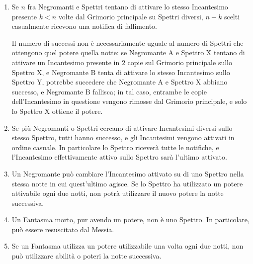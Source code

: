 \documentclass[a4paper,10pt]{article}
\begin{document}
\begin{enumerate}


	\item Se $n$ fra Negromanti e Spettri tentano di attivare lo stesso Incantesimo presente $k<n$ volte dal Grimorio principale su Spettri diversi, $n-k$ scelti casualmente ricevono una notifica di fallimento.

	      Il numero di successi non è necessariamente uguale al numero di Spettri che ottengono quel potere quella notte: se Negromante A e Spettro X tentano di attivare un Incantesimo presente in $2$ copie sul Grimorio principale sullo Spettro X, e Negromante B tenta di attivare lo stesso Incantesimo sullo Spettro Y, potrebbe succedere che Negromante A e Spettro X abbiano successo, e Negromante B fallisca; in tal caso, entrambe le copie dell'Incantesimo in questione vengono rimosse dal Grimorio principale, e solo lo Spettro X ottiene il potere.

	\item Se più Negromanti o Spettri cercano di attivare Incantesimi diversi sullo stesso Spettro, tutti hanno successo, e gli Incantesimi vengono attivati in ordine casuale. In particolare lo Spettro riceverà tutte le notifiche, e l'Incantesimo effettivamente attivo sullo Spettro sarà l'ultimo attivato.

	\item Un Negromante può cambiare l'Incantesimo attivato su di uno Spettro nella stessa notte in cui quest'ultimo agisce. Se lo Spettro ha utilizzato un potere attivabile ogni due notti, non potrà utilizzare il nuovo potere la notte successiva.

	\item Un Fantasma morto, pur avendo un potere, non è uno Spettro. In particolare, può essere resuscitato dal Messia.

	\item Se un Fantasma utilizza un potere utilizzabile una volta ogni due notti, non può utilizzare abilità o poteri la notte successiva.


\end{enumerate}
\end{document}
